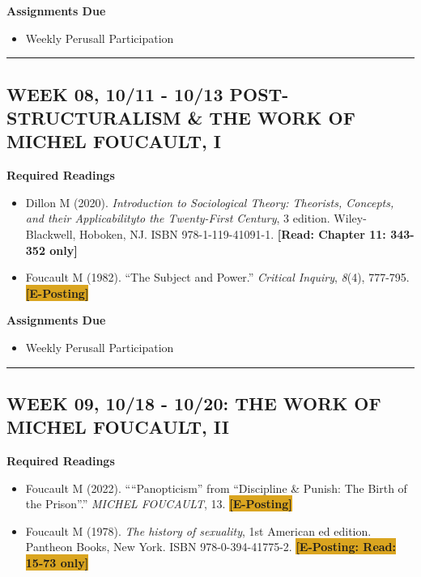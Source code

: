 \documentclass[11pt,]{article}
\providecommand{\tightlist}{%
  \setlength{\itemsep}{0pt}\setlength{\parskip}{0pt}}
\begin{document}
\textbf{Assignments Due}

\begin{itemize}
\tightlist
\item
  Weekly Perusall Participation
\end{itemize}

\bigbreak
\hrule

\hypertarget{week-08-1011---1013-post-structuralism-the-work-of-michel-foucault-i}{%
\subsection{WEEK 08, 10/11 - 10/13 POST-STRUCTURALISM \& THE WORK OF
MICHEL FOUCAULT,
I}\label{week-08-1011---1013-post-structuralism-the-work-of-michel-foucault-i}}

\textbf{Required Readings}

\begin{itemize}
\item
  Dillon M (2020). \emph{Introduction to Sociological Theory: Theorists,
  Concepts, and their Applicabilityto the Twenty-First Century}, 3
  edition. Wiley-Blackwell, Hoboken, NJ. ISBN 978-1-119-41091-1.
  \textcolor{BrickRed}{\bf{[Read: Chapter 11: 343-352 only]}}
\item
  Foucault M (1982). ``The Subject and Power.'' \emph{Critical Inquiry},
  \emph{8}(4), 777-795. \colorbox{Goldenrod}{\bf{[E-Posting]}}
\end{itemize}

\textbf{Assignments Due}

\begin{itemize}
\tightlist
\item
  Weekly Perusall Participation
\end{itemize}

\bigbreak
\hrule

\hypertarget{week-09-1018---1020-the-work-of-michel-foucault-ii}{%
\subsection{WEEK 09, 10/18 - 10/20: THE WORK OF MICHEL FOUCAULT,
II}\label{week-09-1018---1020-the-work-of-michel-foucault-ii}}

\textbf{Required Readings}

\begin{itemize}
\item
  Foucault M (2022). ````Panopticism'' from ``Discipline \& Punish: The
  Birth of the Prison''.'' \emph{MICHEL FOUCAULT}, 13.
  \colorbox{Goldenrod}{\bf{[E-Posting]}}
\item
  Foucault M (1978). \emph{The history of sexuality}, 1st American ed
  edition. Pantheon Books, New York. ISBN 978-0-394-41775-2.
  \colorbox{Goldenrod}{\bf{[E-Posting: Read: 15-73 only]}}
\end{itemize}
\end{document}
